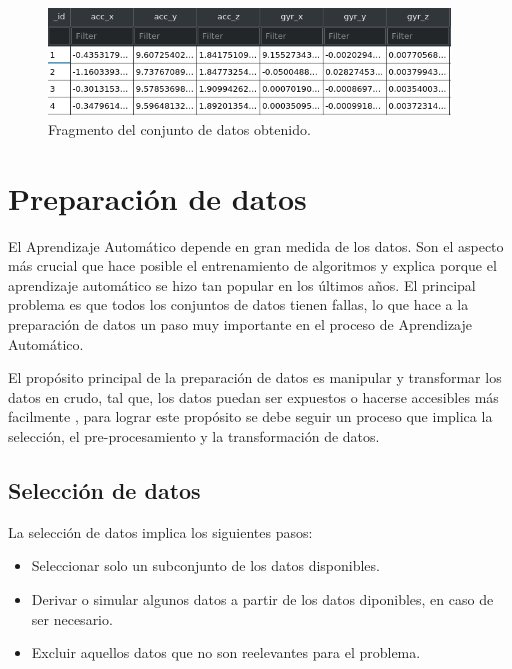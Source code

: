\begin{figure}[h!]
  \begin{center}	\includegraphics[width=0.95\textwidth]{imagenes/Cap3/dataset}
  \caption{Fragmento del conjunto de datos obtenido.}
  \label{fig:dataset}
  \end{center}
\end{figure}

\section{Preparaci\'{o}n de datos}

El Aprendizaje Autom\'{a}tico depende en gran medida de los datos. Son el aspecto m\'{a}s crucial que hace posible el entrenamiento de algoritmos y explica porque el aprendizaje autom\'{a}tico se hizo tan popular en los \'{u}ltimos a\~{n}os. El principal problema es que todos los conjuntos de datos tienen fallas, lo que hace a la preparaci\'{o}n de datos un paso muy importante en el proceso de Aprendizaje Autom\'{a}tico.

\vspace{5mm} %

El prop\'{o}sito principal de la preparaci\'{o}n de datos es manipular y transformar los datos en crudo, tal que, los datos puedan ser expuestos o hacerse accesibles m\'{a}s facilmente \cite{37}, para lograr este prop\'{o}sito se debe seguir un proceso que implica la selecci\'{o}n, el pre-procesamiento y la transformaci\'{o}n de datos.
 
\subsection{Selecci\'{o}n de datos}

La selecci\'{o}n de datos implica los siguientes pasos:

\begin{itemize}
\item Seleccionar solo un subconjunto de los datos disponibles.
\item Derivar o simular algunos datos a partir de los datos diponibles, en caso de ser necesario.
\item Excluir aquellos datos que no son reelevantes para el problema.
\end{itemize}

